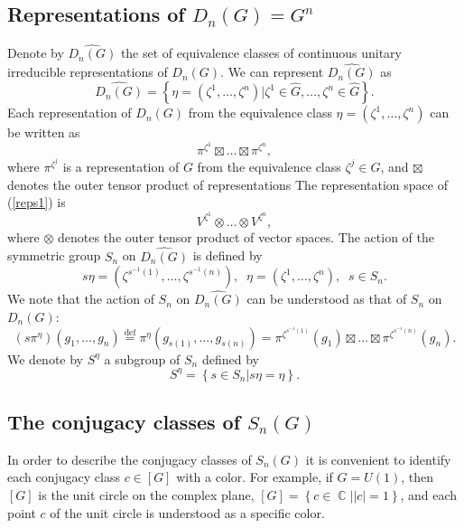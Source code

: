 \documentclass[12pt]{amsart}
\theoremstyle{definition}
\numberwithin{equation}{section}
\DeclareMathOperator{\C}{\mathbb{C}}
\begin{document}
\subsection{Representations of $D_n(G)=G^n$}\label{SubsectionDn}
Denote by $\widehat{D_n(G)}$ the set of equivalence classes of continuous unitary irreducible representations of $D_n(G)$.  We can represent $\widehat{D_n(G)}$ as
$$
\widehat{D_n(G)}=\left\{\eta=\left(\zeta^1,\ldots,\zeta^n\right)\vert
\zeta^1\in\widehat{G},\ldots,\zeta^n\in\widehat{G}\right\}.
$$
Each representation of $D_n(G)$ from the equivalence class $\eta=\left(\zeta^1,\ldots,\zeta^n\right)$ can be written as
\begin{equation}\label{reps1}
\pi^{\zeta^1}\boxtimes\ldots\boxtimes\pi^{\zeta^n},
\end{equation}
where $\pi^{\zeta^j}$ is a representation of $G$ from the equivalence class $\zeta^{j}\in\widehat{G}$, and $\boxtimes$ denotes the outer tensor product of representations
The representation space of (\ref{reps1}) is
\begin{equation}\label{reps3}
V^{\zeta^1}\otimes\ldots\otimes V^{\zeta^n},
\end{equation}
where $\otimes$ denotes the outer tensor product of vector spaces.
The action of the symmetric group $S_n$ on $\widehat{D_n(G)}$  is defined by
$$
s\eta=\left(\zeta^{s^{-1}(1)},\ldots, \zeta^{s^{-1}(n)}\right),\;\;
\eta=\left(\zeta^1,\ldots,\zeta^n\right),\;\; s\in S_n.
$$
We note that the action of $S_n$ on $\widehat{D_n(G)}$ can be understood as
that of $S_n$ on $D_n(G)$:
\begin{equation}\label{reps4}
\left(s\pi^{\eta}\right)(g_1,\ldots,g_n)\overset{\mbox{def}}{=}\pi^{\eta}\left(g_{s(1)},\ldots,g_{s(n)}\right)=\pi^{\zeta^{s^{-1}(1)}}(g_1)
\boxtimes\ldots\boxtimes\pi^{\zeta^{s^{-1}(n)}}(g_n).
\end{equation}
We denote by $S^{\eta}$ a subgroup of $S_n$ defined by
\begin{equation}\label{reps5}
S^{\eta}=\left\{s\in S_n\vert s\eta=\eta\right\}.
\end{equation}
\subsection{The conjugacy classes of $S_n\left(G\right)$}
In order to describe the conjugacy classes of $S_n\left(G\right)$ it is convenient to identify each conjugacy class $c\in\left[G\right]$ with a color. For example, if $G=U(1)$, then $\left[G\right]$
is the unit circle on the complex plane, $\left[G\right]=\left\{c\in\C\vert |c|=1\right\}$, and each point $c$ of the unit circle
is understood as a specific color.
\end{document}
